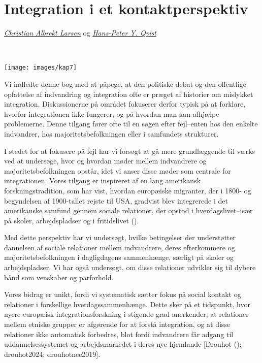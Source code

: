 \documentclass[
]{book}
\begin{document}
\chapter{Integration i et kontaktperspektiv}\label{kap7}

\thispagestyle{empty}

\emph{\href{https://vbn.aau.dk/en/persons/albrekt}{Christian Albrekt Larsen}} og \emph{\href{https://vbn.aau.dk/en/persons/hpq}{Hans-Peter Y. Qvist}}

~~~~

\texttt{[image: images/kap7]}

\newpage

Vi indledte denne bog med at påpege, at den politiske debat og den offentlige opfattelse af indvandring og integration ofte er præget af historier om mislykket integration. Diskussionerne på området fokuserer derfor typisk på at forklare, hvorfor integrationen ikke fungerer, og på hvordan man kan afhjælpe problemerne. Denne tilgang fører ofte til en søgen efter fejl--enten hos den enkelte indvandrer, hos majoritetsbefolkningen eller i samfundets strukturer.

I stedet for at fokusere på fejl har vi forsøgt at gå mere grundlæggende til værks ved at undersøge, hvor og hvordan møder mellem indvandrere og majoritetsbefolkningen opstår, idet vi anser disse møder som centrale for integrationen. Vores tilgang er inspireret af en lang amerikansk forskningstradition, som har vist, hvordan europæiske migranter, der i 1800- og begyndelsen af 1900-tallet rejste til USA, gradvist blev integrerede i det amerikanske samfund gennem sociale relationer, der opstod i hverdagslivet--især på skoler, arbejdspladser og i fritidslivet ().

Med dette perspektiv har vi undersøgt, hvilke betingelser der understøtter dannelsen af sociale relationer mellem indvandrere, deres efterkommere og majoritetsbefolkningen i dagligdagens sammenhænge, særligt på skoler og arbejdspladser. Vi har også undersøgt, om disse relationer udvikler sig til dybere bånd som venskaber og parforhold.

Vores bidrag er unikt, fordi vi systematisk sætter fokus på social kontakt og relationer i forskellige hverdagssammenhænge. Dette sker på et tidspunkt, hvor nyere europæisk integrationsforskning i stigende grad anerkender, at relationer mellem etniske grupper er afgørende for at forstå integration, og at disse relationer ikke automatisk forbedres, blot fordi indvandrere får adgang til uddannelsessystemet og arbejdsmarkedet i deres nye hjemlande {[}Drouhot (); drouhot2024; drouhotnee2019{]}.
\end{document}
